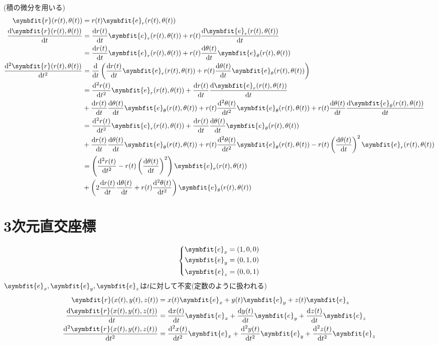 \documentclass[12pt,oneside]{jlreq}
\newcommand{\bm}[1]{\symbfit{#1}}
\begin{document}
(積の微分を用いる)
\begin{align*}
    \bm{r}(r(t),\theta(t))&=r(t)\bm{e}_r(r(t),\theta(t))\\
    \odv{\bm{r}(r(t),\theta(t))}{t}&=\odv{r(t)}{t}\bm{e}_r(r(t),\theta(t))+r(t)\odv{\bm{e}_r(r(t),\theta(t))}{t}\\
    &=\odv{r(t)}{t}\bm{e}_r(r(t),\theta(t))+r(t)\odv{\theta(t)}{t}\bm{e}_{\theta}(r(t),\theta(t))\\
    \odv[2]{\bm{r}(r(t),\theta(t))}{t}&=\odv*{\left(\odv{r(t)}{t}\bm{e}_r(r(t),\theta(t))+r(t)\odv{\theta(t)}{t}\bm{e}_{\theta}(r(t),\theta(t))\right)}{t}\\
    &=\odv[2]{r(t)}{t}\bm{e}_r(r(t),\theta(t))+\odv{r(t)}{t}\odv{\bm{e}_r(r(t),\theta(t))}{t}\\
    &+\odv{r(t)}{t}\odv{\theta(t)}{t}\bm{e}_{\theta}(r(t),\theta(t))+r(t)\odv[2]{\theta(t)}{t}\bm{e}_{\theta}(r(t),\theta(t))+r(t)\odv{\theta(t)}{t}\odv{\bm{e}_{\theta}(r(t),\theta(t))}{t}\\
    &=\odv[2]{r(t)}{t}\bm{e}_r(r(t),\theta(t))+\odv{r(t)}{t}\odv{\theta(t)}{t}\bm{e}_{\theta}(r(t),\theta(t))\\
    &+\odv{r(t)}{t}\odv{\theta(t)}{t}\bm{e}_{\theta}(r(t),\theta(t))+r(t)\odv[2]{\theta(t)}{t}\bm{e}_{\theta}(r(t),\theta(t))-r(t)\left(\odv{\theta(t)}{t}\right)^2\bm{e}_{r}(r(t),\theta(t))\\
    &=\left(\odv[2]{r(t)}{t}-r(t)\left(\odv{\theta(t)}{t}\right)^2\right)\bm{e}_r(r(t),\theta(t))\\
    &+\left(2\odv{r(t)}{t}\odv{\theta(t)}{t}+r(t)\odv[2]{\theta(t)}{t}\right)\bm{e}_{\theta}(r(t),\theta(t))
\end{align*}
\section{3次元直交座標}
\begin{gather*}
    \left\{
        \begin{aligned}
            \bm{e}_x&=\left(1,0,0\right)\\
            \bm{e}_y&=\left(0,1,0\right)\\
            \bm{e}_z&=\left(0,0,1\right)
        \end{aligned}
    \right.
\end{gather*}
\(\bm{e}_x,\bm{e}_y,\bm{e}_z\)は\(t\)に対して不変(定数のように扱われる)\\
\begin{align*}
\bm{r}(x(t),y(t),z(t))&=x(t)\bm{e}_x+y(t)\bm{e}_{y}+z(t)\bm{e}_z\\
\odv{\bm{r}(x(t),y(t),z(t))}{t}&=\odv{x(t)}{t}\bm{e}_x+\odv{y(t)}{t}\bm{e}_{y}+\odv{z(t)}{t}\bm{e}_{z}\\
\odv[2]{\bm{r}(x(t),y(t),z(t))}{t}&=\odv[2]{x(t)}{t}\bm{e}_x+\odv[2]{y(t)}{t}\bm{e}_{y}+\odv[2]{z(t)}{t}\bm{e}_{z}
\end{align*}
\end{document}
